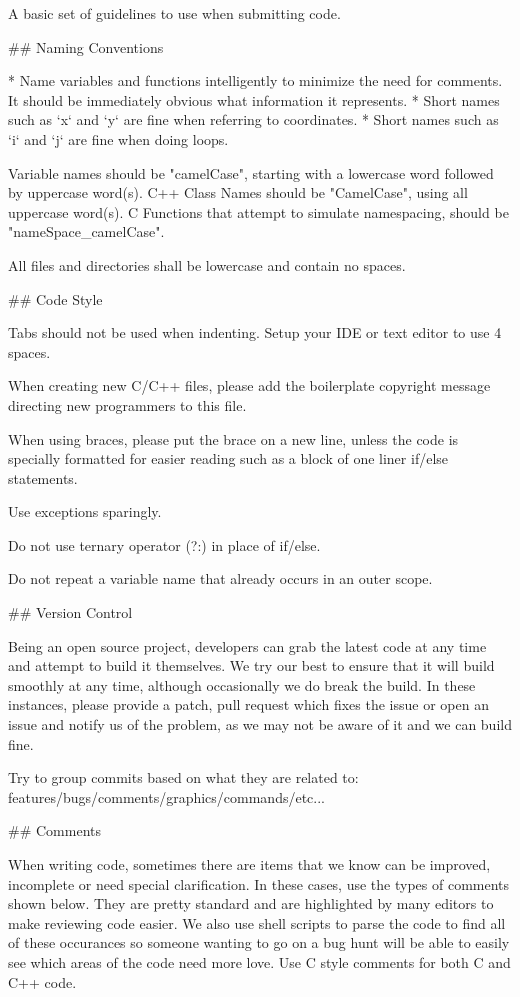 A basic set of guidelines to use when submitting code.

## Naming Conventions

* Name variables and functions intelligently to minimize the need for comments.
It should be immediately obvious what information it represents.
* Short names such as `x` and `y` are fine when referring to coordinates.
* Short names such as `i` and `j` are fine when doing loops.

Variable names should be "camelCase", starting with a lowercase word followed by uppercase word(s).
C++ Class Names should be "CamelCase", using all uppercase word(s).
C Functions that attempt to simulate namespacing, should be "nameSpace_camelCase".

All files and directories shall be lowercase and contain no spaces.

## Code Style

Tabs should not be used when indenting. Setup your IDE or text editor to use 4 spaces.

When creating new C/C++ files, please add the boilerplate copyright message directing
new programmers to this file.

When using braces, please put the brace on a new line, unless the code is specially formatted
for easier reading such as a block of one liner if/else statements.

Use exceptions sparingly.

Do not use ternary operator (?:) in place of if/else.

Do not repeat a variable name that already occurs in an outer scope.

## Version Control 

Being an open source project, developers can grab the latest code at any time
and attempt to build it themselves. We try our best to ensure that it will build smoothly
at any time, although occasionally we do break the build. In these instances,
please provide a patch, pull request which fixes the issue or open an issue and
notify us of the problem, as we may not be aware of it and we can build fine.

Try to group commits based on what they are related to: features/bugs/comments/graphics/commands/etc...

## Comments

When writing code, sometimes there are items that we know can be improved,
incomplete or need special clarification. In these cases, use the types of
comments shown below. They are pretty standard and are highlighted by many editors to
make reviewing code easier. We also use shell scripts to parse the code to find
all of these occurances so someone wanting to go on a bug hunt will be able to
easily see which areas of the code need more love. Use C style comments for
both C and C++ code.

